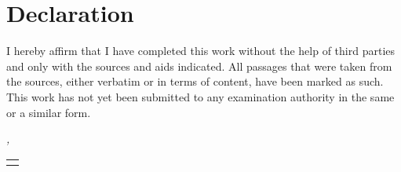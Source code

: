 \chapter*{Declaration}
\thispagestyle{empty}
I hereby affirm that I have completed this work without the help of third parties and only with the sources and aids indicated. All passages that were taken from the sources, either verbatim or in terms of content, have been marked as such. This work has not yet been submitted to any examination authority in the same or a similar form.
\bigskip

\noindent\textit{\myLocation{}, \myTime{}}

\smallskip

\begin{flushright}
    \begin{tabular}{m{5cm}}
        \\ \hline %
        \centering\myName{} \\
    \end{tabular}
\end{flushright}
